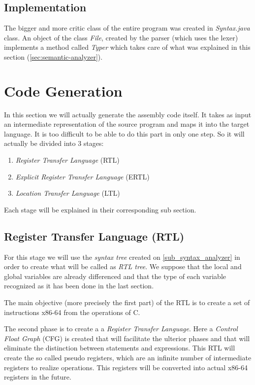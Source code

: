 \documentclass[conference]{IEEEtran}
\begin{document}
\subsection{Implementation}
The bigger and more critic class of the entire program was created in \textit{Syntax.java} class. An object of the class \textit{File}, created by the parser (which uses the lexer) implements a method called \textit{Typer} which takes care of what was explained in this section (\ref{sec:semantic-analyzer}).


\section{Code Generation}
In this section we will actually generate the assembly code itself. It takes as input an intermediate representation of the source program and maps it into the target language. 
It is too difficult to be able to do this part in only one step. So it will actually be divided into 3 stages:
\begin{enumerate}
	\item \textit{Register Transfer Language} (RTL)
	\item \textit{Explicit Register Transfer Language} (ERTL)
	\item \textit{Location Transfer Language} (LTL)
\end{enumerate}
Each stage will be explained in their corresponding sub section.

\subsection{Register Transfer Language (RTL)} \label{sec:RTL}
For this stage we will use the \textit{syntax tree} created on \ref{sub_syntax_analyzer} in order to create what will be called as \textit{RTL tree}. We suppose that the local and global variables are already differenced and that the type of each variable recognized as it has been done in the last section.

The main objective (more precisely the first part) of the RTL is to create a set of instructions x86-64 from the operations of C.

The second phase is to create a a \textit{Register Transfer Language}. Here a \textit{Control Float Graph} (CFG) is created that will facilitate the ulterior phases and that will eliminate the distinction between statements and expressions. This RTL will create the so called pseudo registers, which are an infinite number of intermediate registers to realize operations. This registers will be converted into actual x86-64 registers in the future.
\end{document}
